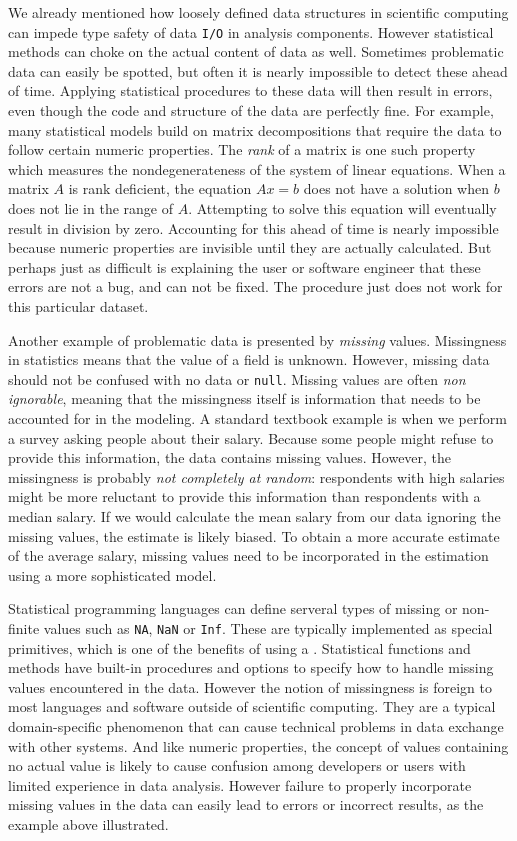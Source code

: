 We already mentioned how loosely defined data structures in scientific computing can impede type safety of data \texttt{I/O} in analysis components. However statistical methods can choke on the actual content of data as well. Sometimes problematic data can easily be spotted, but often it is nearly impossible to detect these ahead of time. Applying statistical procedures to these data will then result in errors, even though the code and structure of the data are perfectly fine. For example, many statistical models build on matrix decompositions that require the data to follow certain numeric properties. The \emph{rank} of a matrix is one such property which measures the nondegenerateness of the system of linear equations. When a matrix $A$ is rank deficient, the equation $Ax=b$ does not have a solution when $b$ does not lie in the range of $A$. Attempting to solve this equation will eventually result in division by zero. Accounting for this ahead of time is nearly impossible because numeric properties are invisible until they are actually calculated. But perhaps just as difficult is explaining the user or software engineer that these errors are not a bug, and can not be fixed. The procedure just does not work for this particular dataset.

Another example of problematic data is presented by \emph{missing} values. Missingness in statistics means that the value of a field is unknown. However, missing data should not be confused with no data or \texttt{null}. Missing values are often \emph{non ignorable}, meaning that the missingness itself is information that needs to be accounted for in the modeling. A standard textbook example is when we perform a survey asking people about their salary. Because some people might refuse to provide this information, the data contains missing values. However, the missingness is probably \emph{not completely at random}: respondents with high salaries might be more reluctant to provide this information than respondents with a median salary. If we would calculate the mean salary from our data ignoring the missing values, the estimate is likely biased. To obtain a more accurate estimate of the average salary, missing values need to be incorporated in the estimation using a more sophisticated model. 

Statistical programming languages can define serveral types of missing or non-finite values such as \texttt{NA}, \texttt{NaN} or \texttt{Inf}. These are typically implemented as special primitives, which is one of the benefits of using a \DSL. Statistical functions and methods have built-in procedures and options to specify how to handle missing values encountered in the data. However the notion of missingness is foreign to most languages and software outside of scientific computing. They are a typical domain-specific phenomenon that can cause technical problems in data exchange with other systems. And like numeric properties, the concept of values containing no actual value is likely to cause confusion among developers or users with limited experience in data analysis. However failure to properly incorporate missing values in the data can easily lead to errors or incorrect results, as the example above illustrated.

